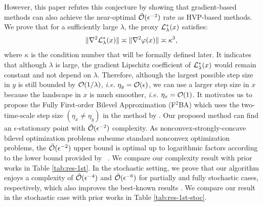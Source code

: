 \documentclass[twoside,11pt]{article}
\begin{document}
However, this paper refutes this conjecture by showing that gradient-based methods can also achieve the near-optimal $\tilde {{\mathcal{O}}}(\epsilon^{-2})$ rate as HVP-based methods.
We prove that for a sufficiently large $\lambda$, the proxy ${\mathcal{L}}_{\lambda}^*(x)$ satisfies:
\begin{align*}
    \Vert \nabla^2 {\mathcal{L}}_{\lambda}^*(x) \Vert \asymp \Vert \nabla^2 \varphi(x) \Vert \asymp \kappa^3,
\end{align*}
where $\kappa$ is the condition number that will be formally defined later. It indicates that although $\lambda$ is large, the gradient Lipschitz coefficient of ${\mathcal{L}}_{\lambda}^*(x)$ would remain constant and not depend on $\lambda$.
{Therefore, although the largest possible step size in $y$ is still bounded by ${\mathcal{O}}(1/\lambda)$, \textit{i.e.} $\eta_y = {\mathcal{O}}(\epsilon)$, we can use a larger step size in $x$  because the landscape in $x$ is much smoother, \textit{i.e.} $\eta_x = {\mathcal{O}}(1)$. It motivates us to propose the Fully First-order Bilevel Approximation (F${}^2$BA) which uses the two-time-scale step size $(\eta_x \ne \eta_y)$ in the method by \citet{kwon2023fully}. Our proposed method can find an $\epsilon$-stationary point with $\tilde {{\mathcal{O}}}(\epsilon^{-2})$ complexity.} As nonconvex-strongly-concave bilevel optimization problems subsume standard nonconvex optimization problems, the $\tilde {{\mathcal{O}}}(\epsilon^{-2})$ upper bound is optimal up to logarithmic factors according to the lower bound provided by ~\cite{carmon2020lower}. We compare our complexity result with prior works in Table \ref{tab:res-1st}. In the stochastic setting, 
we prove that our algorithm enjoys a complexity of $\tilde {{\mathcal{O}}}(\epsilon^{-4})$ and $\tilde {{\mathcal{O}}}(\epsilon^{-6})$
 for partially and fully stochastic cases, respectively, which also improves the best-known results \citet{kwon2023fully}. We compare our result in the stochastic case with prior works in Table \ref{tab:res-1st-stoc}.

\end{document}
